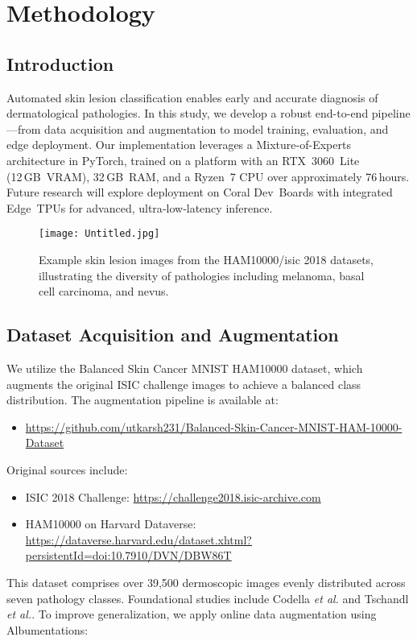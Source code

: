 \chapter{Methodology}
\clearpage

\section{Introduction}
Automated skin lesion classification enables early and accurate diagnosis of dermatological pathologies. In this study, we develop a robust end-to-end pipeline—from data acquisition and augmentation to model training, evaluation, and edge deployment. Our implementation leverages a Mixture-of-Experts architecture in PyTorch, trained on a platform with an RTX 3060 Lite (12 GB VRAM), 32 GB RAM, and a Ryzen 7 CPU over approximately 76 hours. Future research will explore deployment on Coral Dev Boards with integrated Edge TPUs for advanced, ultra‑low‑latency inference.
\begin{figure}[h!]
  \centering
  \texttt{[image: Untitled.jpg]} %
  \caption{Example skin lesion images from the HAM10000/isic 2018 datasets, illustrating the diversity of pathologies including melanoma, basal cell carcinoma, and nevus.}
  \label{fig:skin-lesion-examples}
\end{figure}
\section{Dataset Acquisition and Augmentation}
We utilize the Balanced Skin Cancer MNIST HAM10000 dataset, which augments the original ISIC challenge images to achieve a balanced class distribution. The augmentation pipeline is available at:
\begin{itemize}
\item \url{https://github.com/utkarsh231/Balanced-Skin-Cancer-MNIST-HAM-10000-Dataset}
\end{itemize}
Original sources include:
\begin{itemize}
\item ISIC 2018 Challenge: \url{https://challenge2018.isic-archive.com}
\item HAM10000 on Harvard Dataverse: \url{https://dataverse.harvard.edu/dataset.xhtml?persistentId=doi:10.7910/DVN/DBW86T}
\end{itemize}
This dataset comprises over 39,500 dermoscopic images evenly distributed across seven pathology classes. Foundational studies include Codella \emph{et al.}\cite{codella2018skin} and Tschandl \emph{et al.}\cite{tschandl2018ham10000}. To improve generalization, we apply online data augmentation using Albumentations:

